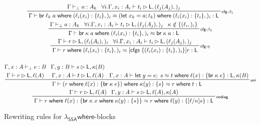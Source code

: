 \documentclass[acmsmall,screen,review]{acmart}
\newcommand{\ms}[1]{\ensuremath{\mathsf{#1}}}
\newcommand{\lto}{:}
\newcommand{\letexpr}[3]{\ensuremath{\ms{let}\;#1 = #2;\;#3}}
\newcommand{\letstmt}[3]{\ensuremath{\ms{let}\;#1 = #2; #3}}
\newcommand{\brb}[2]{\ms{br}\;#1\;#2}
\newcommand{\where}[2]{#1\;\ms{where}\;#2}
\newcommand{\wbranch}[3]{#1(#2) \lto \{#3\}}
\newcommand{\cfgsubst}[1]{\ms{cfgs}\;\{#1\}}
\newcommand{\bhyp}[2]{#1 : #2}
\newcommand{\lhyp}[2]{#1(#2)}
\newcommand{\rle}[1]{{\scriptsize\textsf{#1}}}
\newcommand{\hasty}[4]{#1 \vdash_{#2} #3: {#4}}
\newcommand{\haslb}[3]{#1 \vdash #2 \rhd #3}
\newcommand{\teqv}{\approx}
\newcommand{\lbeq}[4]{#1 \vdash #2 \teqv #3 : {#4}}
\newcommand{\isotopessa}{\(\lambda_{\ms{SSA}}\)}
\begin{document}
\begin{figure}
  \begin{gather*}
      \prftree[r]{\rle{cfg-$\beta_1$}}
        {\hasty{\Gamma}{\bot}{a}{A_k}}
        {\forall i. \haslb{\Gamma, \bhyp{x_i}{A_i}}{t_i}{\ms{L}, (\lhyp{\ell_j}{A_j},)_j}}
        {\lbeq{\Gamma}
          {\where{\brb{\ell_k}{a}}{(\wbranch{\ell_i}{x_i}{t_i},)_i}}
          {\where{(\letstmt{x_k}{a}{t_k})}{(\wbranch{\ell_i}{x_i}{t_i},)_i}}
          {\ms{L}}}
      \\
      \prftree[r]{\rle{cfg-$\beta_2$}}
        {\hasty{\Gamma}{\bot}{a}{A_k}}
        {\forall i. \haslb{\Gamma, \bhyp{x_i}{A_i}}{t_i}{\ms{L}, (\lhyp{\ell_j}{A_j},)_j}}
        {\kappa \notin \{(\ell_i,)_i\}}
        {\lbeq{\Gamma}
          {\where{\brb{\kappa}{a}}{(\wbranch{\ell_i}{x_i}{t_i},)_i}}
          {\brb{\kappa}{a}}
          {\ms{L}}}
      \\
        \prftree[r]{\rle{cfg-$\eta$}}
        {\haslb{\Gamma}{r}{\ms{L}, (\lhyp{\ell_i}{A_i},)_i}}
        {\forall i. \haslb{\Gamma, \bhyp{x_i}{A_i}}{t_i}{\ms{L}, (\lhyp{\ell_j}{A_j},)_j}}
        {
          \lbeq{\Gamma}
            {\where{r}{(\wbranch{\ell_i}{x_i}{t_i},)_i}}
            {[\cfgsubst{(\wbranch{\ell_i}{x_i}{t_i},)_i}]r}
            {\ms{L}}
        }
      \\
      \\
      \prftree[r]{\rle{uni}}
        {
          \prfStackPremises
          {\hasty{\Gamma, \bhyp{x}{A}}{\bot}{e}{B}}
          {\haslb{\Gamma}{r}{\ms{L}, \ell(A)}}
        }
        {
          \prfStackPremises
          {\haslb{\Gamma, \bhyp{y}{B}}{s}{\ms{L}, \kappa(B)}}
          {\haslb{\Gamma, \bhyp{x}{A}}{t}{\ms{L}, \ell(A)}}
        }
        {
          \lbeq{\Gamma, \bhyp{x}{A}}
            {\letexpr{y}{e}{s}}
            {\where{t}{\wbranch{\ell}{x}{\brb{\kappa}{e}}}}
            {\ms{L}, \kappa(B)}
        }
        {
          \lbeq{\Gamma}
            {\where{(\where{r}{\wbranch{\ell}{x}{\brb{\kappa}{e}}})}
              {\wbranch{\kappa}{y}{s}}}
            {\where{r}{t}}
            {\ms{L}}
        }
      \\
      \prftree[r]{\rle{codiag}}
        {\haslb{\Gamma}{r}{\ms{L}, \ell(A)}}
        {\haslb{\Gamma, \bhyp{y}{A}}{s}{\ms{L}, \ell(A), \kappa(A)}}
        {\lbeq{\Gamma}{\where{r}{\wbranch{\ell}{x}{\where{\brb{\kappa}{x}}
          {\wbranch{\kappa}{y}{s}}}}}
        {\where{r}{\wbranch{\ell}{y}{[\ell/\kappa]s}}}
        {\ms{L}}}
  \end{gather*}
  \Description{}
  \caption{Rewriting rules for \isotopessa \ms{where}-blocks}
  \label{fig:ssa-where-rules}
\end{figure}
\end{document}
